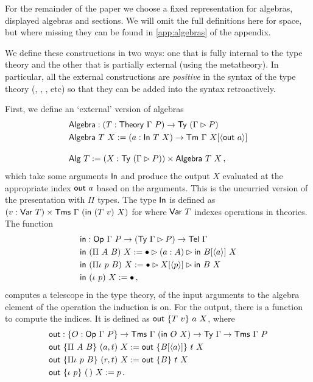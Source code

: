 For the remainder of the paper we choose a fixed representation for algebras,
displayed algebras and sections. We will omit the full definitions here for
space, but where missing they can be found in \cref{app:algebras} of the appendix.

We define these constructions in two ways: one that is fully internal to the
type theory and the other that is partially external (using the metatheory).
In particular, all the external constructions are \emph{positive} in the
syntax of the type theory (, , , etc) so that
they can be added into the syntax retroactively.

First, we define an `external' version of algebras
\begin{align*}
    &\mta{Algebra} : (T : \mta{Theory}\ \Gamma\ P) \to \Ty\ (\Gamma \rhd P) \\
    &\mta{Algebra}\ T\ X := (a : \mta{In}\ T\ X) \to \Tm\ \Gamma\ X[\Msub{\mta{out}\ a}] \\[1em]
    &\mta{Alg}\ T := (X : \Ty\ (\Gamma \rhd P)) \times \mta{Algebra}\ T\ X \,,
\end{align*}
which take some arguments $\textsf{In}$ and produce the output $X$
evaluated at the appropriate index $\mta{out}\ a$ based on the arguments.
This is the uncurried version of the presentation with $\Pi$ types.
The type $\textsf{In}$ is defined as $(v : \textsf{Var}\ T) \times \textsf{Tms}\ \Gamma\
(\textsf{in}\ (T\ v)\ X)$ for where $\textsf{Var}\ T$ indexes
operations in theories. The function
\begin{align*}
    &\mta{in} : \mta{Op}\ \Gamma\ P \to (\Ty\ \Gamma \rhd P) \to \Tel\ \Gamma \\
    &\mta{in}\ (\Pi\ A\ B)\ X := \bullet \rhd (a : A) \rhd \mta{in}\ B[\Msub a]\ X \\
    &\mta{in}\ (\Pi\iota\ p\ B)\ X := \bullet \rhd X[\Msub p] \rhd \mta{in}\ B\ X \\
    &\mta{in}\ (\iota\ p)\ X := \bullet \,,
\end{align*}
computes a telescope in the type theory, of the input arguments to the algebra
element of the operation the induction is on. For the output, there is a function to compute
the indices. It is defined as $\textsf{out}\ \{T\ v\}\ a\ X$, where
\begin{align*}
    &\mta{out} : \{O : \Op\ \Gamma\ P\} \to \Tms\ \Gamma\ (\mta{in}\ O\ X) \to \Ty\ \Gamma \to \Tms\ \Gamma\ P \\
    &\mta{out}\ \{\Pi\ A\ B\}\ (a, t)\ X := \mta{out}\ \{B[\Msub a]\}\ t\ X \\
    &\mta{out}\ \{\Pi\iota\ p\ B\}\ (r, t)\ X := \mta{out}\ \{B\}\ t\ X \\
    &\mta{out}\ \{\iota\ p\}\ (\,)\ X := p \,.
\end{align*}
